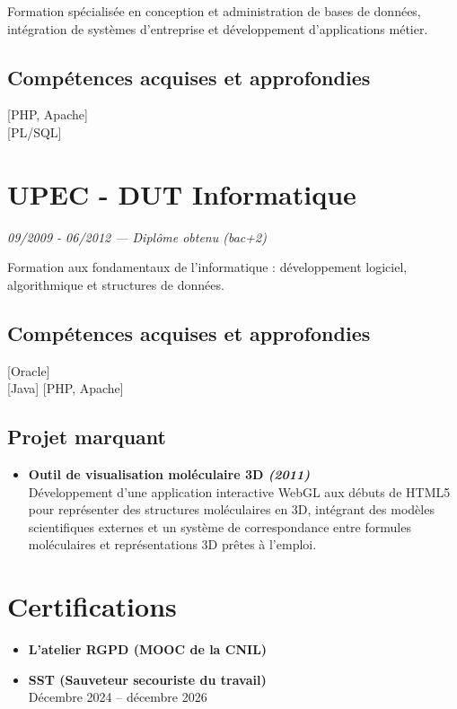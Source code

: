 {    Formation spécialisée en conception et administration de bases de données, intégration de systèmes d'entreprise et développement d'applications métier.

    \subsection{Compétences acquises et approfondies}
     [PHP, Apache]\\
    [PL/SQL]  


    \section[\faMortarBoard]{UPEC - DUT Informatique}
    \textit{09/2009 - 06/2012 — Diplôme obtenu (bac+2)}

    Formation aux fondamentaux de l'informatique : développement logiciel, algorithmique et structures de données.

    \subsection{Compétences acquises et approfondies}
      [Oracle] \\
     [Java] [PHP, Apache]

    \subsection{Projet marquant}
    \begin{itemize}[label=\faTrophy]
        \item \textbf{Outil de visualisation moléculaire 3D \textit{(2011)}}\\
        Développement d'une application interactive WebGL aux débuts de HTML5 pour représenter des structures moléculaires en 3D,
        intégrant des modèles scientifiques externes et un système de correspondance entre formules moléculaires et représentations 3D prêtes à l'emploi.
    \end{itemize}


    \section[\faCertificate]{Certifications}

    \begin{itemize}[label=\faCertificate]
        \item \textbf{L'atelier RGPD (MOOC de la CNIL)}
        \item \textbf{SST (Sauveteur secouriste du travail)}\\
        Décembre 2024 – décembre 2026
    \end{itemize}

}
\makebody
\endgroup
